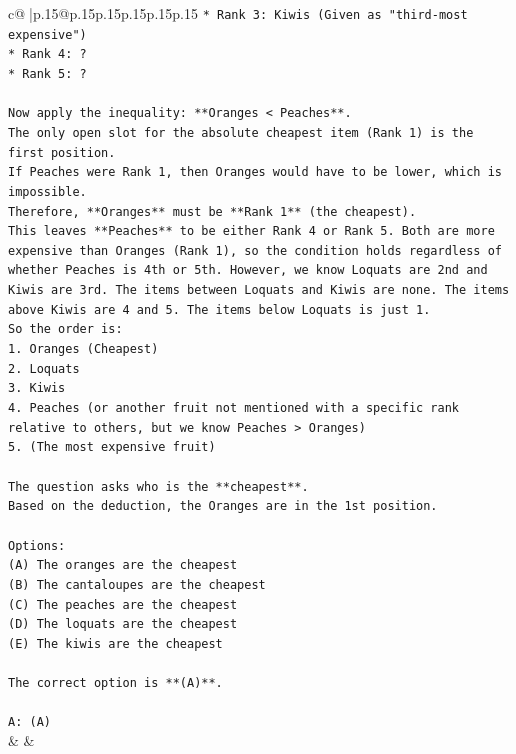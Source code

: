 \documentclass{article}
\begin{document}
{\begin{supertabular}{c@{$\;$}|p{.15\linewidth}@{}p{.15\linewidth}p{.15\linewidth}p{.15\linewidth}p{.15\linewidth}p{.15\linewidth}}
{{{\texttt{*   Rank 3: Kiwis (Given as "third{-}most expensive")} \\
\texttt{*   Rank 4: ?} \\
\texttt{*   Rank 5: ?} \\
\\ 
\texttt{Now apply the inequality: **Oranges < Peaches**.} \\
\texttt{The only open slot for the absolute cheapest item (Rank 1) is the first position.} \\
\texttt{If Peaches were Rank 1, then Oranges would have to be lower, which is impossible.} \\
\texttt{Therefore, **Oranges** must be **Rank 1** (the cheapest).} \\
\texttt{This leaves **Peaches** to be either Rank 4 or Rank 5. Both are more expensive than Oranges (Rank 1), so the condition holds regardless of whether Peaches is 4th or 5th. However, we know Loquats are 2nd and Kiwis are 3rd. The items between Loquats and Kiwis are none. The items above Kiwis are 4 and 5. The items below Loquats is just 1.} \\
\texttt{So the order is:} \\
\texttt{1.  Oranges (Cheapest)} \\
\texttt{2.  Loquats} \\
\texttt{3.  Kiwis} \\
\texttt{4.  Peaches (or another fruit not mentioned with a specific rank relative to others, but we know Peaches > Oranges)} \\
\texttt{5.  (The most expensive fruit)} \\
\\ 
\texttt{The question asks who is the **cheapest**.} \\
\texttt{Based on the deduction, the Oranges are in the 1st position.} \\
\\ 
\texttt{Options:} \\
\texttt{(A) The oranges are the cheapest} \\
\texttt{(B) The cantaloupes are the cheapest} \\
\texttt{(C) The peaches are the cheapest} \\
\texttt{(D) The loquats are the cheapest} \\
\texttt{(E) The kiwis are the cheapest} \\
\\ 
\texttt{The correct option is **(A)**.} \\
\\ 
\texttt{A: (A)} \\
            }
        }
    }
    & & \\ \\


\end{supertabular}}
\end{document}
